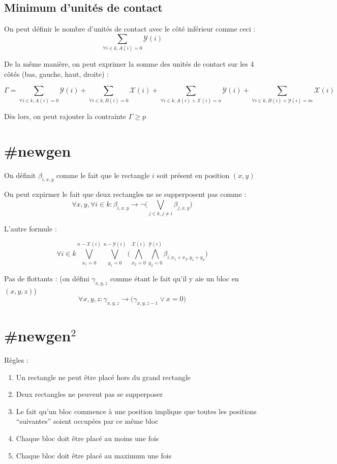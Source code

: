 \documentclass[a4paper]{article}
\begin{document}
\subsection{Minimum d'unités de contact}

On peut définir le nombre d'unités de contact avec le côté inférieur comme ceci :
$$
\sum_{\forall i \in k, A(i) = 0} \mathcal{Y}(i)
$$

De la même manière, on peut exprimer la somme des unités de contact sur les 4 côtés (bas, gauche, haut, droite) :

$$
\Gamma = \sum_{\forall i \in k, A(i) = 0} \mathcal{Y}(i) +
\sum_{\forall i \in k, B(i) = 0} \mathcal{X}(i) +
\sum_{\forall i \in k, A(i) + \mathcal{X}(i) =  n} \mathcal{Y}(i) +
\sum_{\forall i \in k, B(i) + \mathcal{Y}(i) = m} \mathcal{X}(i)
$$

Dès lors, on peut rajouter la contrainte $\Gamma \geq p$


\section{\#newgen}

On définit $\beta_{i, x, y}$ comme le fait que le rectangle $i$ soit présent en position $(x,y)$

On peut expirmer le fait que deux rectangles ne se supperposent pas comme : $$
\forall x,y , \forall i \in k : \beta_{i, x, y} \rightarrow
\lnot \Big( \bigvee_{j \in k, j \neq i} \beta_{j, x, y} \Big)
$$

L'autre formule :

$$
\forall i \in k \bigvee_{x_1=0}^{n-\mathcal{X}(i)} \bigvee_{y_1=0}^{n-\mathcal{Y}(i)}
\Big(
  \bigwedge_{x_2=0}^{\mathcal{X}(i)} \bigwedge_{y_2=0}^{\mathcal{Y}(i)} \beta_{i, x_1 + x_2, y_1 + y_2}
\Big)
$$


Pas de flottants : (on défini $\gamma_{x, y , z}$ comme étant le fait qu'il y aie un bloc en $(x, y , z)$)
$$
\forall x,y,z : \gamma_{x, y, z} \rightarrow  \Big( \gamma_{x, y, z - 1}  \lor x = 0 \Big)
$$


\section{\#newgen$^{2}$}

Règles :
\begin{enumerate}
  \item Un rectangle ne peut être placé hors du grand rectangle
  \item Deux rectangles ne peuvent pas se supperposer
  \item Le fait qu'un bloc commence à une position implique que toutes les positions ``suivantes'' soient occupées par ce même bloc
  \item Chaque bloc doit être placé au moins une fois
  \item Chaque bloc doit être placé au maximum une fois
\end{enumerate}
\end{document}
